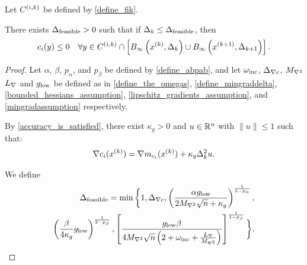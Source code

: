 \begin{lemma}
\label{each_constraints_cone_is_feasible}
Let ${C^{(i, k)}}$ be defined by \cref{define_fik}.



There exists ${\Delta_{\textrm{feasible}}} > 0$ such that
if $\Delta_k \le {\Delta_{\textrm{feasible}}}$, then
\begin{align*}
c_i(y) \le 0 \quad \forall y \in {C^{(i, k)}} \cap \left[{ B_{\infty}\left(x^{(k)}, \Delta_k\right) } \cup { B_{\infty}\left({{x}^{(k+1)}}, \Delta_{k+1}\right) }\right].
\end{align*}
\end{lemma}

\begin{proof}
Let
$\alpha$, $\beta$, $p_{\alpha}$, and $p_{\beta}$
be defined by
\cref{define_abpab},
and let
$\omega_{\text{inc}}$,
${\Delta_{\nabla c}}$,
${M_{\nabla^2}}$
${L_{\nabla}}$
and ${ g_{\textrm{low}} }$
be defined as in
\cref{define_the_omegas},
\cref{define_mingraddelta},
\cref{bounded_hessians_assumption},
\cref{lipschitz_gradients_assumption},
and \cref{mingradassumption}
respectively.

By \cref{accuracy_is_satisfied}, there exist $\kappa_g > 0$ and $u\in\mathbb R^n$ with $\|u\|\le 1$ such that:
\begin{align}
\nabla c_i(x^{(k)}) = \nabla m_{c_i}(x^{(k)}) + \kappa_g\Delta_k^2 u. \label{model_error_for_gradient}
\end{align}

We define
\begin{align}
{\Delta_{\textrm{feasible}}} = \min\bigg\{
1,
{\Delta_{\nabla c}},
\left(\frac{\alpha { g_{\textrm{low}} }}{2 {M_{\nabla^2}} \sqrt{n} + \kappa_g}\right)^{\frac 1 {1-p_{\alpha}}}, \nonumber \\
\left(\frac{\beta}{4\kappa_g}{ g_{\textrm{low}} }\right)^{\frac 1 {2 - p_{\beta}}}, 
\left[\frac {{ g_{\textrm{low}} }  \beta} {4{M_{\nabla^2}}\sqrt{n}\left(2 + \omega_{\text{inc}} + \frac {{L_{\nabla}}} {{M_{\nabla^2}}} \right)}\right]^{\frac1 {1 - p_{\beta}} }
\bigg\}. \label{define_delta_feasible}
\end{align}




\end{proof}
